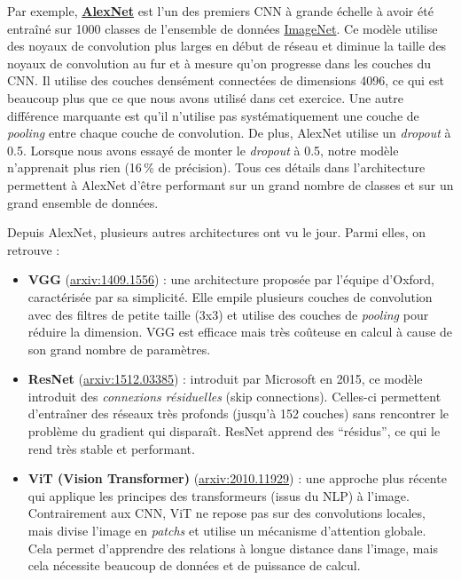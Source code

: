 \documentclass{article}
\begin{document}
Par exemple, \href{https://proceedings.neurips.cc/paper_files/paper/2012/file/c399862d3b9d6b76c8436e924a68c45b-Paper.pdf}{\textbf{AlexNet}}  est l’un des premiers CNN à grande échelle à avoir été entraîné sur 1000 classes de l’ensemble de données \href{https://arxiv.org/abs/1409.0575}{ImageNet}. Ce modèle utilise des noyaux de convolution plus larges en début de réseau et diminue la taille des noyaux de convolution au fur et à mesure qu’on progresse dans les couches du CNN. Il utilise des couches densément connectées de dimensions 4096, ce qui est beaucoup plus que ce que nous avons utilisé dans cet exercice. Une autre différence marquante est qu’il n’utilise pas systématiquement une couche de \emph{pooling} entre chaque couche de convolution. De plus, AlexNet utilise un \emph{dropout} à 0.5. Lorsque nous avons essayé de monter le \emph{dropout} à 0.5, notre modèle n’apprenait plus rien (16\,\% de précision). Tous ces détails dans l’architecture permettent à AlexNet d’être performant sur un grand nombre de classes et sur un grand ensemble de données.

Depuis AlexNet, plusieurs autres architectures ont vu le jour. Parmi elles, on retrouve :

\begin{itemize}
    \item \textbf{VGG} (\href{https://arxiv.org/abs/1409.1556}{arxiv:1409.1556}) : une architecture proposée par l’équipe d’Oxford, caractérisée par sa simplicité. Elle empile plusieurs couches de convolution avec des filtres de petite taille (3x3) et utilise des couches de \emph{pooling} pour réduire la dimension. VGG est efficace mais très coûteuse en calcul à cause de son grand nombre de paramètres.

    \item \textbf{ResNet} (\href{https://arxiv.org/abs/1512.03385}{arxiv:1512.03385}) : introduit par Microsoft en 2015, ce modèle introduit des \emph{connexions résiduelles} (skip connections). Celles-ci permettent d’entraîner des réseaux très profonds (jusqu’à 152 couches) sans rencontrer le problème du gradient qui disparaît. ResNet apprend des ``résidus'', ce qui le rend très stable et performant.

    \item \textbf{ViT (Vision Transformer)} (\href{https://arxiv.org/abs/2010.11929}{arxiv:2010.11929}) : une approche plus récente qui applique les principes des transformeurs (issus du NLP) à l’image. Contrairement aux CNN, ViT ne repose pas sur des convolutions locales, mais divise l’image en \emph{patchs} et utilise un mécanisme d’attention globale. Cela permet d’apprendre des relations à longue distance dans l’image, mais cela nécessite beaucoup de données et de puissance de calcul.
\end{itemize}
\end{document}
